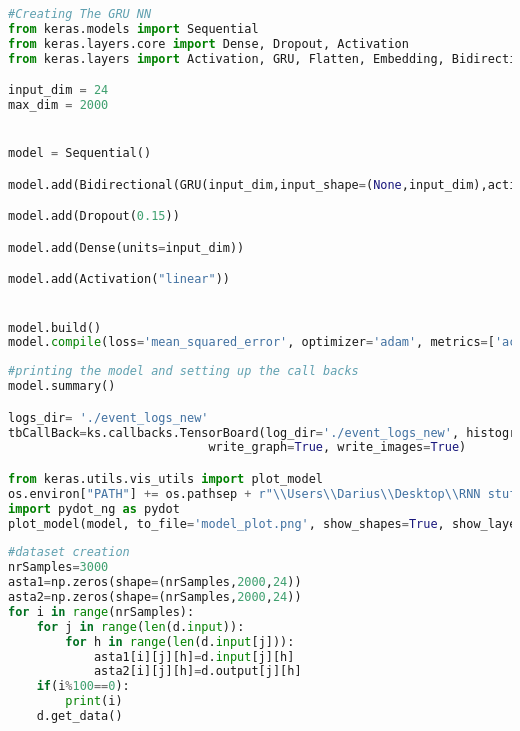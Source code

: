 \begin{lstlisting}[language=Python, label=lst:gru nn]
#Creating The GRU NN
from keras.models import Sequential
from keras.layers.core import Dense, Dropout, Activation
from keras.layers import Activation, GRU, Flatten, Embedding, Bidirectional

input_dim = 24
max_dim = 2000


model = Sequential()

model.add(Bidirectional(GRU(input_dim,input_shape=(None,input_dim),activation='tanh',return_sequences=True)))

model.add(Dropout(0.15))

model.add(Dense(units=input_dim))

model.add(Activation("linear"))


model.build()
model.compile(loss='mean_squared_error', optimizer='adam', metrics=['accuracy'])

\end{lstlisting}

\begin{lstlisting}[language=Python, label=lst:summary]
#printing the model and setting up the call backs
model.summary()

logs_dir= './event_logs_new'
tbCallBack=ks.callbacks.TensorBoard(log_dir='./event_logs_new', histogram_freq=0,
                            write_graph=True, write_images=True)

from keras.utils.vis_utils import plot_model
os.environ["PATH"] += os.pathsep + r"\\Users\\Darius\\Desktop\\RNN stuff\\graphviz\\"
import pydot_ng as pydot
plot_model(model, to_file='model_plot.png', show_shapes=True, show_layer_names=True)

\end{lstlisting}

\begin{lstlisting}[language=Python, label=lst:datasetcreation]
#dataset creation
nrSamples=3000
asta1=np.zeros(shape=(nrSamples,2000,24))
asta2=np.zeros(shape=(nrSamples,2000,24))
for i in range(nrSamples):
    for j in range(len(d.input)):
        for h in range(len(d.input[j])):
            asta1[i][j][h]=d.input[j][h]
            asta2[i][j][h]=d.output[j][h]
    if(i%100==0):
        print(i)
    d.get_data()
            
\end{lstlisting}

